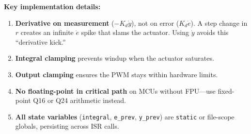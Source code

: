 \begin{mdframed}[linewidth=1pt, innertopmargin=10pt, innerbottommargin=10pt]
\textbf{Key implementation details:}
\begin{enumerate}[nosep]
    \item \textbf{Derivative on measurement} ($-K_d \dot{y}$), not on error ($K_d \dot{e}$). A step change in $r$ creates an infinite $\dot{e}$ spike that slams the actuator. Using $\dot{y}$ avoids this ``derivative kick.''
    \item \textbf{Integral clamping} prevents windup when the actuator saturates.
    \item \textbf{Output clamping} ensures the PWM stays within hardware limits.
    \item \textbf{No floating-point in critical path} on MCUs without FPU---use fixed-point Q16 or Q24 arithmetic instead.
    \item \textbf{All state variables} (\texttt{integral}, \texttt{e\_prev}, \texttt{y\_prev}) are \texttt{static} or file-scope globals, persisting across ISR calls.
\end{enumerate}
\end{mdframed}

